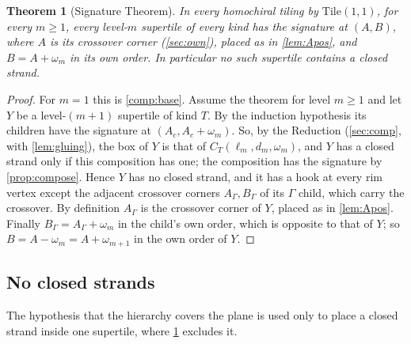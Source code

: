 \documentclass[11pt]{amsart}
\newtheorem{theorem}{Theorem}[section]
\theoremstyle{definition}
\theoremstyle{remark}
\newcommand{\Tile}{\mathrm{Tile}(1,1)}
\begin{document}
\begin{theorem}[Signature Theorem]\label{thm:signature}
In every homochiral tiling by $\Tile$, for every $m\ge1$, every level-$m$ supertile of every kind has the signature at
$(A,B)$, where $A$ is its crossover corner (\cref{sec:own}), placed as in \cref{lem:Apos}, and $B=A+\omega_m$ in its own
order. In particular no such supertile contains a closed strand.
\end{theorem}

\begin{proof}
For $m=1$ this is \cref{comp:base}. Assume the theorem for level $m\ge1$ and let $Y$ be a level-$(m+1)$ supertile of
kind $T$. By the induction hypothesis its children have the signature at $(A_c,A_c+\omega_m)$. So, by the Reduction
(\cref{sec:comp}, with \cref{lem:gluing}), the box of $Y$ is that of $C_T(\ell_m,d_m,\omega_m)$, and $Y$ has a closed
strand only if this
composition has one; the composition has the signature by \cref{prop:compose}. Hence $Y$ has no closed strand, and it
has a hook at every rim vertex except the adjacent crossover corners $A_\Gamma,B_\Gamma$ of its $\Gamma$ child, which
carry the crossover. By definition $A_\Gamma$ is the crossover corner of $Y$, placed as in \cref{lem:Apos}. Finally
$B_\Gamma=A_\Gamma+\omega_m$ in the child's own order, which is opposite to that of $Y$; so $B=A-\omega_m=A+\omega_{m+1}$
in the own order of $Y$.
\end{proof}

\subsection{No closed strands}\label{sec:noclosed}
The hypothesis that the hierarchy covers the plane is used only to place a closed strand inside one supertile, where
\cref{thm:signature} excludes it.
\end{document}
